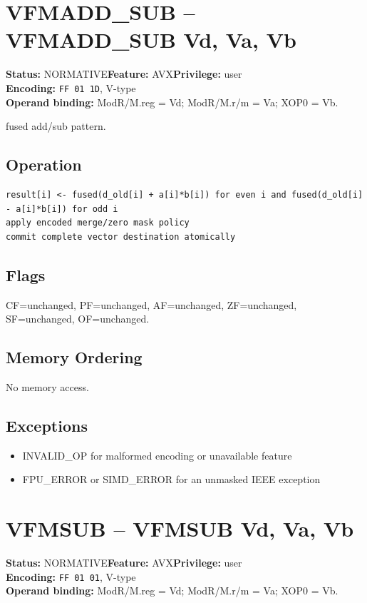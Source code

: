 \documentclass[10pt]{article}
\begin{document}
\section{VFMADD\_SUB -- VFMADD\_SUB Vd, Va, Vb}
\textbf{Status:} NORMATIVE\quad \textbf{Feature:} AVX\quad \textbf{Privilege:} user\\
\textbf{Encoding:} \texttt{FF 01 1D}, V-type\\
\textbf{Operand binding:} ModR/M.reg = Vd; ModR/M.r/m = Va; XOP0 = Vb.

fused add/sub pattern.

\subsection*{Operation}
\begin{lstlisting}
result[i] <- fused(d_old[i] + a[i]*b[i]) for even i and fused(d_old[i] - a[i]*b[i]) for odd i
apply encoded merge/zero mask policy
commit complete vector destination atomically
\end{lstlisting}
\subsection*{Flags}
CF=unchanged, PF=unchanged, AF=unchanged, ZF=unchanged, SF=unchanged, OF=unchanged.
\subsection*{Memory Ordering}
No memory access.
\subsection*{Exceptions}
\begin{itemize}
\item INVALID\_OP for malformed encoding or unavailable feature
\item FPU\_ERROR or SIMD\_ERROR for an unmasked IEEE exception
\end{itemize}
\clearpage

\section{VFMSUB -- VFMSUB Vd, Va, Vb}
\textbf{Status:} NORMATIVE\quad \textbf{Feature:} AVX\quad \textbf{Privilege:} user\\
\textbf{Encoding:} \texttt{FF 01 01}, V-type\\
\textbf{Operand binding:} ModR/M.reg = Vd; ModR/M.r/m = Va; XOP0 = Vb.
\end{document}
